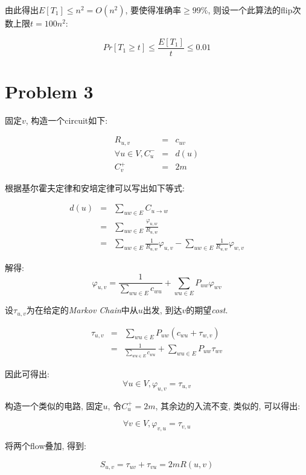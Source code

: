 \documentclass[paper=a4, fontsize=11pt]{scrartcl} %
\numberwithin{figure}{section} %
\numberwithin{table}{section} %
\begin{document}
	由此得出$E[T_1] \leq n^2 = O(n^2)$, 要使得准确率$\geq 99\%$, 则设一个此算法的flip次数上限$t=100n^2$:

	$$\textit{Pr}\left[T_1 \geq t\right] \leq \frac{E[T_1]}{t} \leq 0.01 $$ 

\section*{Problem 3}
	固定$v$, 构造一个circuit如下:

	\begin{eqnarray*}
	R_{u,v} & = & c_{uv} \\
	\forall u\in V, C^{-}_u  & = & d(u) \\
	C^{+}_v & = & 2m 
	\end{eqnarray*}
	
	根据基尔霍夫定律和安培定律可以写出如下等式:

	\begin{eqnarray*}
		d(u) & = & \sum_{uw\in E} C_{u\rightarrow w} \\
			 & = & \sum_{uw\in E} \frac{\varphi_{u,w}}{R_{u,w}} \\
			 & = & \sum_{uw\in E} \frac{1}{R_{u,w}} \varphi_{u,v} - \sum_{uw \in E} \frac{1}{R_{u,w}} \varphi_{w,v}
	\end{eqnarray*}

	解得:
	$$\varphi_{u,v} = \frac{1}{\sum\limits_{wu\in E} c_{wu}} + \sum_{wu \in E}P_{uw}\varphi_{wv} $$

	设$\tau_{u,v}$为在给定的\textit{Markov Chain}中从$u$出发, 到达$v$的期望\textit{cost}.

	\begin{eqnarray*}
	\tau_{u,v} & = & \sum_{wu\in E}P_{uw} (c_{wu} + \tau_{w, v}) \\ & = & \frac{1}{\sum\limits_{wu\in E} c_{wu}} + \sum_{wu\in E}P_{uw}\tau_{wv}
	\end{eqnarray*}
	
	因此可得出: 
	$$\forall u\in V, \varphi_{u,v} = \tau_{u,v}$$ 

	构造一个类似的电路, 固定$u$, 令$C^{+}_u = 2m$, 其余边的入流不变, 类似的, 可以得出:

	$$\forall v\in V, \varphi_{v,u} = \tau_{v,u}$$

	将两个flow叠加, 得到:

	$$S_{u,v} = \tau_{uv} + \tau_{vu} = 2m R(u,v)$$
\end{document}
